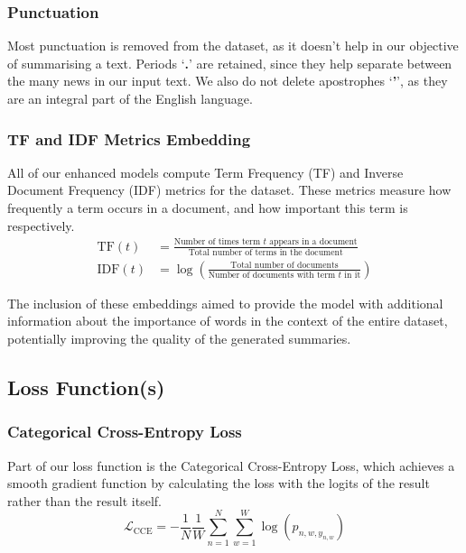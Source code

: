 \subsubsection{Punctuation}
Most punctuation is removed from the dataset, as it doesn't help in our objective of summarising a text.
Periods \textsf{`\textbf{.}'} are retained, since they help separate between the many news in our input text.
We also do not delete apostrophes \textsf{`\textbf{'}'}, as they are an integral part of the English language\cite{apostrophes}.

\subsubsection{TF and IDF Metrics Embedding}

All of our enhanced models compute Term Frequency (TF) and Inverse Document Frequency (IDF) metrics for the dataset\cite{nallapati2016abstractive}.
These metrics measure how frequently a term occurs in a document, and how important this term is respectively.
\begin{align}
	\text{TF}(t) &= \frac{\text{Number of times term $t$ appears in a document}}{\text{Total number of terms in the document}} \\[1ex]
	\text{IDF}(t) &= \log \left( \frac{\text{Total number of documents}}{\text{Number of documents with term $t$ in it}} \right)
\end{align}

The inclusion of these embeddings aimed to provide the model with additional information about the importance of words in the context of the entire dataset, potentially improving the quality of the generated summaries.

\subsection{Loss Function(s)}

\subsubsection{Categorical Cross-Entropy Loss}

Part of our loss function is the Categorical Cross-Entropy Loss\cite{cross_entropy_loss}, which achieves a smooth gradient function by calculating the loss with the logits of the result rather than the result itself.
\begin{equation}
	\mathcal{L}_\text{CCE} = - \frac{1}{N} \frac{1}{W} \sum_{n=1}^{N} \sum^W_{w = 1} \log(p_{n,w,y_{n,w}})
\end{equation}

